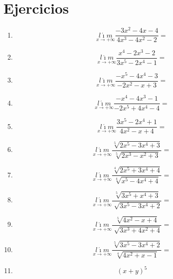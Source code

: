 \documentclass[oneside,spanish,letter]{article}
\begin{document}
\section{Ejercicios}
\begin{enumerate}
 \item $$\underset{x\rightarrow +\infty}{l\acute{\imath}m} \frac{-3x^2-4x-4}{4x^3-4x^2-2}=$$
 \item $$\underset{x\rightarrow +\infty}{l\acute{\imath}m} \frac{x^4-2x^3-2}{3x^5-2x^4-1}=$$
 \item $$\underset{x\rightarrow +\infty}{l\acute{\imath}m} \frac{-x^5-4x^4-3}{-2x^2-x+3}=$$
 \item $$\underset{x\rightarrow +\infty}{l\acute{\imath}m} \frac{-x^4-4x^3-1}{-2x^5+4x^4-4}=$$
 \item $$\underset{x\rightarrow +\infty}{l\acute{\imath}m} \frac{3x^5-2x^4+1}{4x^2-x+4}=$$
 \item $$\underset{x\rightarrow +\infty}{l\acute{\imath}m} \frac{\sqrt[5]{2x^5-3x^4+3}}{\sqrt[5]{2x^3-x^2+3}}=$$
 \item $$\underset{x\rightarrow +\infty}{l\acute{\imath}m} \frac{\sqrt[4]{2x^5+3x^4+4}}{\sqrt[4]{x^5-4x^4+4}}=$$
 \item $$\underset{x\rightarrow +\infty}{l\acute{\imath}m} \frac{\sqrt[5]{3x^5+x^4+3}}{\sqrt[]{3x^5-3x^4+2}}=$$
 \item $$\underset{x\rightarrow +\infty}{l\acute{\imath}m} \frac{\sqrt[5]{4x^2-x+4}}{\sqrt[]{3x^3+4x^2+4}}=$$
 \item $$\underset{x\rightarrow +\infty}{l\acute{\imath}m} \frac{\sqrt[5]{3x^5-3x^4+2}}{\sqrt[4]{4x^2+x-1}}=$$
\item $$(x+y)^5$$
 \end{enumerate}
  \newpage
\end{document}
